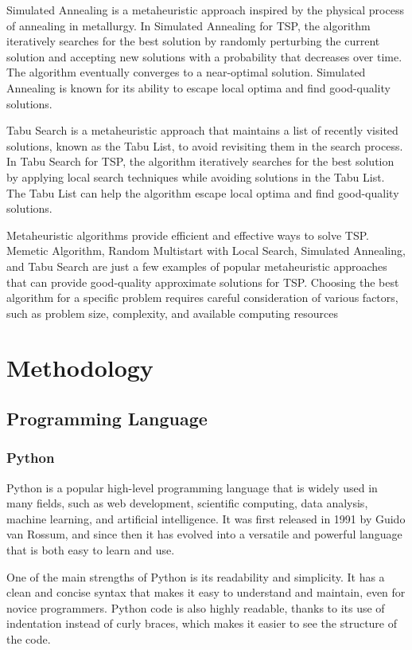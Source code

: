 \documentclass[conference]{IEEEtran}
\begin{document}
    Simulated Annealing is a metaheuristic approach inspired by the physical process of annealing in metallurgy. In Simulated Annealing for TSP, the algorithm iteratively searches for the best solution by randomly perturbing the current solution and accepting new solutions with a probability that decreases over time. The algorithm eventually converges to a near-optimal solution. Simulated Annealing is known for its ability to escape local optima and find good-quality solutions.

    Tabu Search is a metaheuristic approach that maintains a list of recently visited solutions, known as the Tabu List, to avoid revisiting them in the search process. In Tabu Search for TSP, the algorithm iteratively searches for the best solution by applying local search techniques while avoiding solutions in the Tabu List. The Tabu List can help the algorithm escape local optima and find good-quality solutions.

    Metaheuristic algorithms provide efficient and effective ways to solve TSP. Memetic Algorithm, Random Multistart with Local Search, Simulated Annealing, and Tabu Search are just a few examples of popular metaheuristic approaches that can provide good-quality approximate solutions for TSP. Choosing the best algorithm for a specific problem requires careful consideration of various factors, such as problem size, complexity, and available computing resources


    \section{Methodology}

    \subsection{Programming Language}

    \subsubsection{Python}
    Python is a popular high-level programming language that is widely used in many fields, such as web development, scientific computing, data analysis, machine learning, and artificial intelligence. It was first released in 1991 by Guido van Rossum, and since then it has evolved into a versatile and powerful language that is both easy to learn and use.

    One of the main strengths of Python is its readability and simplicity. It has a clean and concise syntax that makes it easy to understand and maintain, even for novice programmers. Python code is also highly readable, thanks to its use of indentation instead of curly braces, which makes it easier to see the structure of the code.
\end{document}
